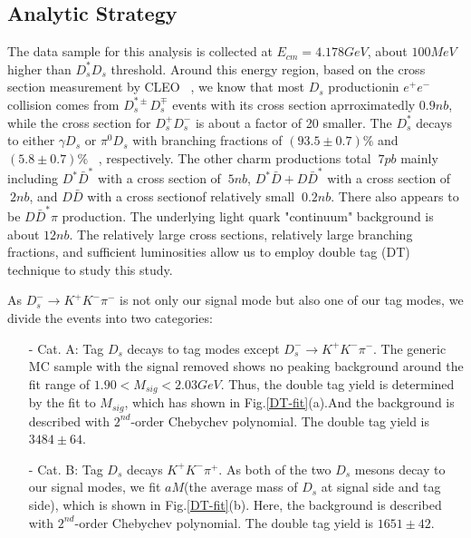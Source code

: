 \par{
    \subsection{Analytic Strategy}
    The data sample for this analysis is collected at $E_{cm}=4.178GeV$, about $100MeV$ higher than $D_{s}^{*}D_{s}$ threshold. Around this energy region, based on the cross section measurement by CLEO ~\cite{PRD80-072001}, we know that most $D_{s}$ productionin $e^{+}e^{-}$ collision comes from $D_{s}^{*\pm}D_{s}^{\mp}$ events with its cross section aprroximatedly $0.9nb$, while the cross section for $D_{s}^{+}D_{s}^{-}$ is about a factor of 20 smaller.
    The $D_{s}^{*}$ decays to either $\gamma D_{s}$ or $\pi^{0}D_{s}$ with branching fractions of $(93.5\pm0.7)\%$ and $(5.8\pm0.7)\%$ ~\cite{PDG2018}, respectively. 
    The other charm productions total $~7pb$ mainly including $D^{*}\bar{D}^{*}$ with a cross section of $~5nb$, $D^{*}\bar{D} + D\bar{D}^{*}$ with a cross section of $~2nb$, and $D\bar{D}$ with a cross sectionof relatively small $~0.2 nb$.
    There also appears to be $D\bar{D}^{*}\pi$ production.
    The underlying light quark "continuum" background is about $12 nb$. 
    The relatively large cross sections, relatively large branching fractions, and sufficient luminosities allow us to employ double tag (DT) technique to study this study.

    As $D_{s}^{-} \rightarrow K^{+}K^{-}\pi^{-}$ is not only our signal mode but also one of our tag modes, we divide the events into two categories:

    \begin{itemize}
        \item[-] Cat. A: Tag $D_{s}$ decays to tag modes except $D_{s}^{-} \rightarrow K^{+}K^{-}\pi^{-}$. The generic MC sample with the signal removed shows no peaking background around the fit range of $1.90 < M_{sig} < 2.03 GeV$.
            Thus, the double tag yield is determined by the fit to $M_{sig}$, which has shown in Fig.\ref{DT-fit}(a).And the background is described with $2^{nd}$-order Chebychev polynomial. The double tag yield is $3484\pm64$. 
        \item[-] Cat. B: Tag $D_{s}$ decays $K^{+}K^{-}\pi^{+}$. As both of the two $D_{s}$ mesons decay to our signal modes, we fit $aM$(the average mass of $D_{s}$ at signal side and tag side), which is shown in Fig.\ref{DT-fit}(b). 
            Here, the background is described with $2^{nd}$-order Chebychev polynomial. The double tag yield is $1651\pm42$. 
    \end{itemize}

}
